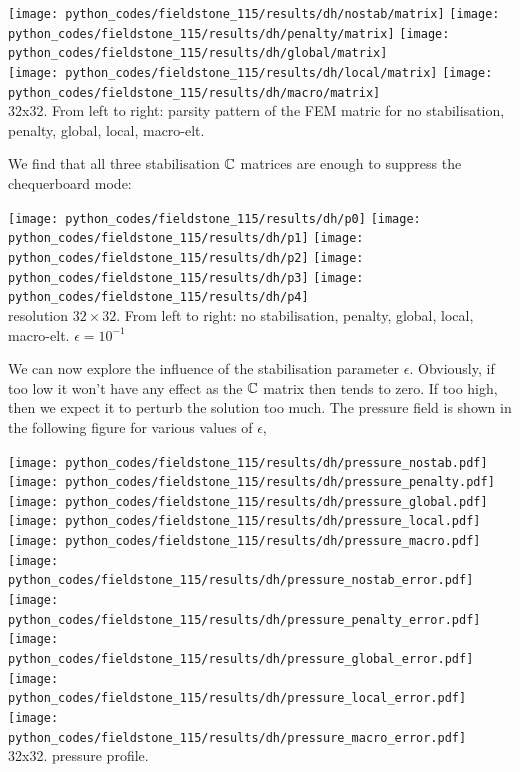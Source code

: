 \begin{center}
\texttt{[image: python\_codes/fieldstone\_115/results/dh/nostab/matrix]}
\texttt{[image: python\_codes/fieldstone\_115/results/dh/penalty/matrix]}
\texttt{[image: python\_codes/fieldstone\_115/results/dh/global/matrix]}\\
\texttt{[image: python\_codes/fieldstone\_115/results/dh/local/matrix]}
\texttt{[image: python\_codes/fieldstone\_115/results/dh/macro/matrix]}\\
{\captionfont 32x32. From left to right: parsity pattern of the FEM matric for 
no stabilisation, penalty, global, local, macro-elt.}
\end{center}

We find that all three stabilisation ${\mathbb{C}}$ matrices are enough to suppress the chequerboard mode:
\begin{center}
\texttt{[image: python\_codes/fieldstone\_115/results/dh/p0]}
\texttt{[image: python\_codes/fieldstone\_115/results/dh/p1]}
\texttt{[image: python\_codes/fieldstone\_115/results/dh/p2]}
\texttt{[image: python\_codes/fieldstone\_115/results/dh/p3]}
\texttt{[image: python\_codes/fieldstone\_115/results/dh/p4]}\\
{\captionfont resolution $32\times 32$. From left to right: no stabilisation, penalty, 
global, local, macro-elt. $\epsilon=10^{-1}$}
\end{center}

We can now explore the influence of the stabilisation parameter $\epsilon$. Obviously, 
if too low it won't have any effect as the ${\mathbb{C}}$ matrix then tends to zero. If too high,
then we expect it to perturb the solution too much. 
The pressure field is shown in the following figure for various values of $\epsilon$, 


\begin{center}
\texttt{[image: python\_codes/fieldstone\_115/results/dh/pressure\_nostab.pdf]}
\texttt{[image: python\_codes/fieldstone\_115/results/dh/pressure\_penalty.pdf]}
\texttt{[image: python\_codes/fieldstone\_115/results/dh/pressure\_global.pdf]}
\texttt{[image: python\_codes/fieldstone\_115/results/dh/pressure\_local.pdf]}
\texttt{[image: python\_codes/fieldstone\_115/results/dh/pressure\_macro.pdf]}\\
\texttt{[image: python\_codes/fieldstone\_115/results/dh/pressure\_nostab\_error.pdf]}
\texttt{[image: python\_codes/fieldstone\_115/results/dh/pressure\_penalty\_error.pdf]}
\texttt{[image: python\_codes/fieldstone\_115/results/dh/pressure\_global\_error.pdf]}
\texttt{[image: python\_codes/fieldstone\_115/results/dh/pressure\_local\_error.pdf]}
\texttt{[image: python\_codes/fieldstone\_115/results/dh/pressure\_macro\_error.pdf]}\\
{\captionfont 32x32. pressure profile.} 
\end{center}

